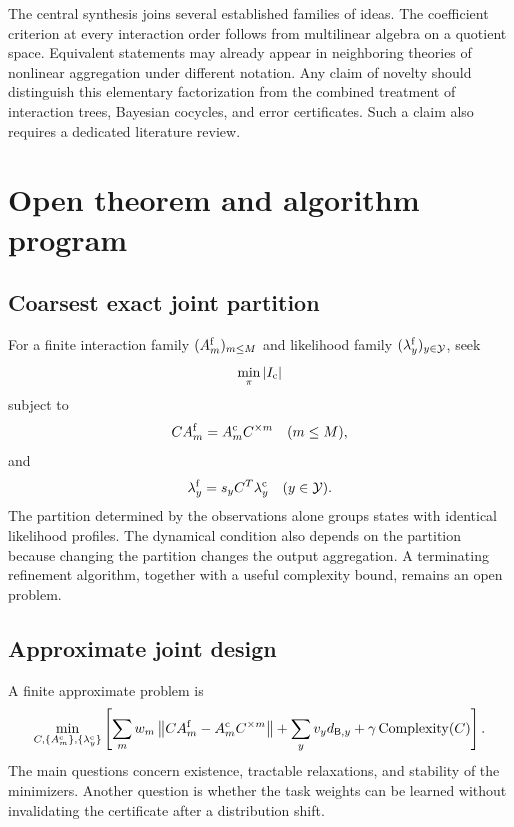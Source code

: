 \begin{PRIQboundary}
The central synthesis joins several established families of ideas.  The coefficient criterion at every interaction order follows from multilinear algebra on a quotient space.  Equivalent statements may already appear in neighboring theories of nonlinear aggregation under different notation.  Any claim of novelty should distinguish this elementary factorization from the combined treatment of interaction trees, Bayesian cocycles, and error certificates.  Such a claim also requires a dedicated literature review.
\end{PRIQboundary}

\section{Open theorem and algorithm program}\label{PRIQ:sec:open}

\subsection{Coarsest exact joint partition}
For a finite interaction family $(A_m^{\mathrm f})_{m\leq M}$ and likelihood family $(\lambda_y^{\mathrm f})_{y\in\mathcal Y}$, seek
\begin{equation}\label{PRIQ:eq:coarsest-joint-partition}
  \min_{\pi}|I_{\mathrm c}|
\end{equation}
subject to
\[
  CA_m^{\mathrm f}=A_m^{\mathrm c}C^{\times m}
  \quad(m\leq M),
\]
and
\[
  \lambda_y^{\mathrm f}=s_yC^T\lambda_y^{\mathrm c}
  \quad(y\in\mathcal Y).
\]
The partition determined by the observations alone groups states with identical likelihood profiles.  The dynamical condition also depends on the partition because changing the partition changes the output aggregation.  A terminating refinement algorithm, together with a useful complexity bound, remains an open problem.

\subsection{Approximate joint design}
A finite approximate problem is
\[
  \min_{C,\{A_m^{\mathrm c}\},\{\lambda_y^{\mathrm c}\}}
  \left[
  \sum_mw_m\left\lVert CA_m^{\mathrm f}-A_m^{\mathrm c}C^{\times m}\right\rVert
  +\sum_yv_yd_{\mathsf B,y}
  +\gamma\operatorname{Complexity}(C)
  \right].
\]
The main questions concern existence, tractable relaxations, and stability of the minimizers.  Another question is whether the task weights can be learned without invalidating the certificate after a distribution shift.

